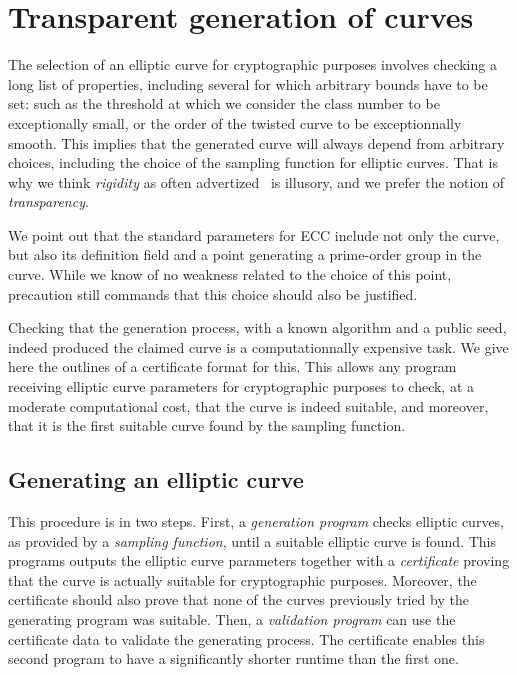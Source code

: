 \documentclass[twocolumn,letterpaper,10pt]{article}
\begin{document}
\section{Transparent generation of curves}
\label{s:certif}

The selection of an elliptic curve for cryptographic purposes
involves checking a long list of properties,
including several for which arbitrary bounds have to be set:
such as the threshold at which we consider the class number
to be exceptionally small,
or the order of the twisted curve to be exceptionnally smooth.
This implies that the generated curve
will always depend from arbitrary choices,
including the choice of the sampling function for elliptic curves.
That is why we think \emph{rigidity} as often advertized~\cite{safecurves}
is illusory, and we prefer the notion of \emph{transparency}.

We point out that the standard parameters for ECC
include not only the curve, but also its definition field
and a point generating a prime-order group in the curve.
While we know of no weakness related to the choice of this point,
precaution still commands that this choice should also be justified.


Checking that the generation process,
with a known algorithm and a public seed,
indeed produced the claimed curve
is a computationnally expensive task.
We give here the outlines of a certificate format for this.
This allows any program receiving elliptic curve parameters
for cryptographic purposes
to check, at a moderate computational cost,
that the curve is indeed suitable,
and moreover, that it is the first suitable curve
found by the sampling function.

\subsection{Generating an elliptic curve}

This procedure is in two steps.
First, a \emph{generation program}
checks elliptic curves, as provided by a \emph{sampling function},
until a suitable elliptic curve is found.
This programs outputs the elliptic curve parameters
together with a \emph{certificate} proving that
the curve is actually suitable for cryptographic purposes.
Moreover, the certificate should also prove that
none of the curves previously tried by the generating program
was suitable.
Then, a \emph{validation program} can use the certificate data
to validate the generating process.
The certificate enables this second program
to have a significantly shorter runtime than the first one.
\end{document}
